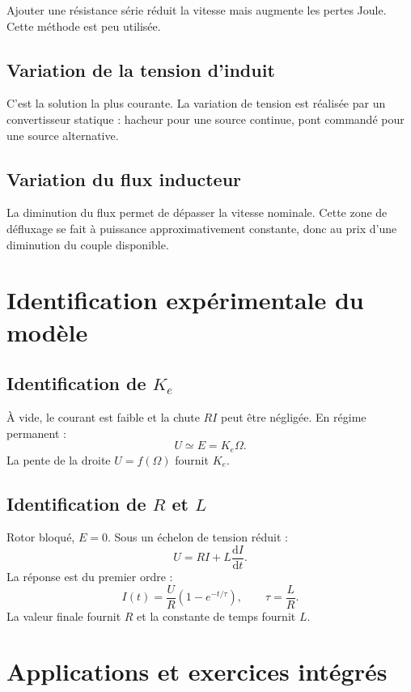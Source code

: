 Ajouter une résistance série réduit la vitesse mais augmente les pertes Joule. Cette méthode est
peu utilisée.

\subsection{Variation de la tension d'induit}

\TLVariationVitesseMCC

C'est la solution la plus courante. La variation de tension est réalisée par un convertisseur
statique : hacheur pour une source continue, pont commandé pour une source alternative.

\subsection{Variation du flux inducteur}

La diminution du flux permet de dépasser la vitesse nominale. Cette zone de défluxage se fait à
puissance approximativement constante, donc au prix d'une diminution du couple disponible.

\section{Identification expérimentale du modèle}\label{sec:mcc-identification}

\TLEssaisIdentificationMCC

\subsection{Identification de $K_e$}

À vide, le courant est faible et la chute $RI$ peut être négligée. En régime permanent :
\[
U\simeq E=K_e\Omega.
\]
La pente de la droite $U=f(\Omega)$ fournit $K_e$.

\subsection{Identification de $R$ et $L$}

Rotor bloqué, $E=0$. Sous un échelon de tension réduit :
\[
U=RI+L\frac{\mathrm dI}{\mathrm dt}.
\]
La réponse est du premier ordre :
\[
I(t)=\frac{U}{R}\left(1-e^{-t/\tau}\right),\qquad \tau=\frac{L}{R}.
\]
La valeur finale fournit $R$ et la constante de temps fournit $L$.

\section{Applications et exercices intégrés}\label{sec:mcc-applications}

